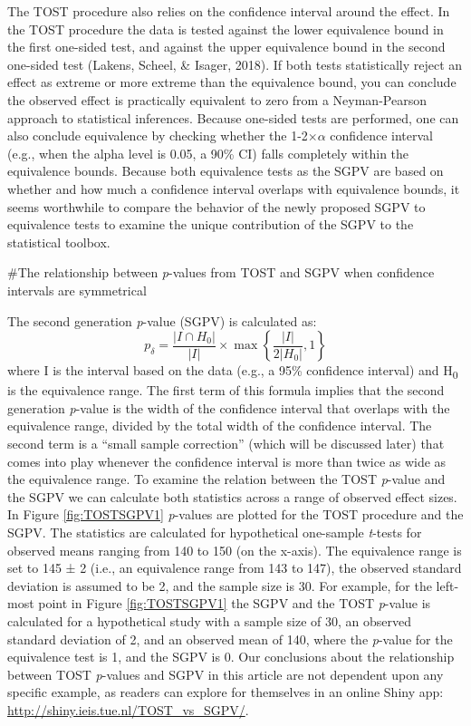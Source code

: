 \documentclass[,man,floatsintext]{apa6}
\begin{document}
The TOST procedure also relies on the confidence interval around the effect.
In the TOST procedure the data is tested against the lower equivalence bound in the first one-sided test, and against the upper equivalence bound in the second one-sided test (Lakens, Scheel, \& Isager, 2018).
If both tests statistically reject an effect as extreme or more extreme than the equivalence bound, you can conclude the observed effect is practically equivalent to zero from a Neyman-Pearson approach to statistical inferences.
Because one-sided tests are performed, one can also conclude equivalence by checking whether the 1-2\(\times\)\(\alpha\) confidence interval (e.g., when the alpha level is 0.05, a 90\% CI) falls completely within the equivalence bounds.
Because both equivalence tests as the SGPV are based on whether and how much a confidence interval overlaps with equivalence bounds, it seems worthwhile to compare the behavior of the newly proposed SGPV to equivalence tests to examine the unique contribution of the SGPV to the statistical toolbox.

\#The relationship between \emph{p}-values from TOST and SGPV when confidence intervals are symmetrical

The second generation \emph{p}-value (SGPV) is calculated as:
\[
  p _ { \delta } = \frac { \left| I \cap H _ { 0 } \right| } { | I | } \times \max \left\{ \frac { | I | } { 2 \left| H _ { 0 } \right| } , 1 \right\}
\]
where I is the interval based on the data (e.g., a 95\% confidence interval) and H\textsubscript{0} is the equivalence range. The first term of this formula implies that the second generation \emph{p}-value is the width of the confidence interval that overlaps with the equivalence range, divided by the total width of the confidence interval. The second term is a \enquote{small sample correction} (which will be discussed later) that comes into play whenever the confidence interval is more than twice as wide as the equivalence range.
To examine the relation between the TOST \emph{p}-value and the SGPV we can calculate both statistics across a range of observed effect sizes. In Figure \ref{fig:TOSTSGPV1} \emph{p}-values are plotted for the TOST procedure and the SGPV. The statistics are calculated for hypothetical one-sample \emph{t}-tests for observed means ranging from 140 to 150 (on the x-axis). The equivalence range is set to 145 ± 2 (i.e., an equivalence range from 143 to 147), the observed standard deviation is assumed to be 2, and the sample size is 30. For example, for the left-most point in Figure \ref{fig:TOSTSGPV1} the SGPV and the TOST \emph{p}-value is calculated for a hypothetical study with a sample size of 30, an observed standard deviation of 2, and an observed mean of 140, where the \emph{p}-value for the equivalence test is 1, and the SGPV is 0. Our conclusions about the relationship between TOST \emph{p}-values and SGPV in this article are not dependent upon any specific example, as readers can explore for themselves in an online Shiny app: \url{http://shiny.ieis.tue.nl/TOST_vs_SGPV/}.
\end{document}
